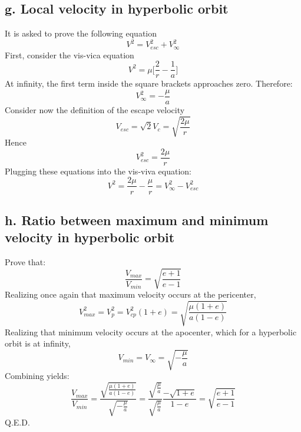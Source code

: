\subsection{g. Local velocity in hyperbolic orbit}
It is asked to prove the following equation
\begin{equation}
V^2 = V_{esc}^2+V_{\infty}^2
\end{equation}
First, consider the vis-vica equation
\begin{equation}
V^2 = \mu \Big[\frac{2}{r} - \frac{1}{a}\Big]
\end{equation}
At infinity, the first term inside the square brackets approaches zero. Therefore:
\begin{equation}
V_{\infty}^2 = -\frac{\mu}{a}
\end{equation}
Consider now the definition of the escape velocity
\begin{equation}
V_{esc} = \sqrt{2} V_c = \sqrt{\frac{2\mu}{r}}
\end{equation}
Hence
\begin{equation}
V_{esc}^2 = \frac{2\mu}{r}
\end{equation}
Plugging these equations into the vis-viva equation:
\begin{equation}
V^2 = \frac{2\mu}{r} - \frac{\mu}{r} = V_{\infty}^2-V_{esc}^2
\end{equation}
\subsection{h. Ratio between maximum and minimum velocity in hyperbolic orbit}
Prove that:
\begin{equation}
\frac{V_{max}}{V_{min}} = \sqrt{\frac{e+1}{e-1}}
\end{equation}
Realizing once again that maximum velocity occurs at the pericenter,
\begin{equation}
V_{max}^2 = V_p^2 = V_{cp}^2(1+e) = \sqrt{\frac{\mu(1+e)}{a(1-e)}}
\end{equation}
Realizing that minimum velocity occurs at the apocenter, which for a hyperbolic orbit is at infinity,
\begin{equation}
V_{min} = V_{\infty} = \sqrt{-\frac{\mu}{a}}
\end{equation}
Combining yields:
\begin{equation}
\frac{V_{max}}{V_{min}} =\frac{\sqrt{\frac{\mu(1+e)}{a(1-e)}}}{\sqrt{-\frac{\mu}{a}}}
 = \frac{\sqrt{\frac{\mu}{a}}}{\sqrt{\frac{\mu}{a}}} \frac{-\sqrt{1+e}}{1-e} = \sqrt{\frac{e+1}{e-1}}
\end{equation}
Q.E.D.
\clearpage









